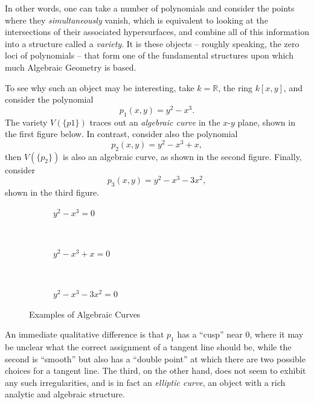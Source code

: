 \documentclass{article}
\theoremstyle{definition}
\newcommand{\RR}{\mathbb{R}}
\newcommand{\theset}[1]{\{ #1 \}}
\begin{document}
In other words, one can take a number of polynomials and consider the
points where they \emph{simultaneously} vanish, which is equivalent to
looking at the intersections of their associated hypersurfaces, and
combine all of this information into a structure called a
\emph{variety}. It is these objects -- roughly speaking, the zero loci
of polynomials -- that form one of the fundamental structures upon
which much Algebraic Geometry is based.

To see why such an object may be interesting, take \(k=\RR\), the ring
\(k[x,y]\), and consider the polynomial \[p_1(x,y) = y^2-x^3.\] The
variety \(V(\theset{p1})\) traces out an \emph{algebraic curve} in the
\(x\)-\(y\) plane, shown in the first figure below. In contrast, consider also the
polynomial \[p_2(x,y) = y^2-x^3+x,\] then \(V(\theset{p_2})\) is also an
algebraic curve, as shown in the second figure. Finally, consider
\[p_3(x,y) = y^{2} - x^{3}-3x^{2},\] shown in the third figure.

\begin{figure}[H]
\centering
\begin{subfigure}[b]{0.3\textwidth}

\caption{$y^2-x^3 = 0$}
\label{fig:gull}
\end{subfigure}
~ %
\begin{subfigure}[b]{0.3\textwidth}

\caption{$y^2-x^3+x = 0$}
\label{fig:tiger}
\end{subfigure}
~ %
\begin{subfigure}[b]{0.3\textwidth}

\caption{$y^{2} - x^{3}-3x^{2} = 0$}
\label{fig:mouse}
\end{subfigure}
\caption{Examples of Algebraic Curves}\label{fig:animals}
\end{figure}

An immediate qualitative difference is that \(p_1\) has a ``cusp'' near 0,
where it may be unclear what the correct assignment of a tangent line
should be, while the second is ``smooth'' but also has a ``double point'' at
which there are two possible choices for a tangent line. The third, on
the other hand, does not seem to exhibit any such irregularities, and is in fact an \textit{elliptic curve}, an object with a
rich analytic and algebraic structure.
\end{document}
